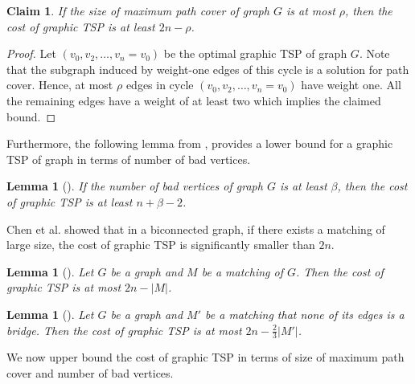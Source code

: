 \documentclass[letterpaper,11pt]{article}
\newtheorem{lemma}[theorem]{Lemma}
\newtheorem{claim}[theorem]{Claim}
\newenvironment{myproof}{
\vspace{-0.5cm}
\begin{proof}
}{
\end{proof}
}
\begin{document}
\begin{claim}\label{lem: lower-bound-path}
If the size of maximum path cover of graph $G$ is at most $\rho$, then the cost of graphic TSP is at least $2n - \rho$.  
\end{claim}
\begin{myproof}
Let $(v_0, v_2, \ldots, v_n = v_0)$ be the optimal graphic TSP of graph $G$. Note that the subgraph induced by weight-one edges of this cycle is a solution for path cover. Hence, at most $\rho$ edges in cycle $(v_0, v_2, \ldots, v_n = v_0)$ have weight one. All the remaining edges have a weight of at least two which implies the claimed bound.
\end{myproof}

Furthermore, the following lemma from \cite{chen2020}, provides a lower bound for a graphic TSP of graph in terms of number of bad vertices.

\begin{lemma}[{\cite[Lemma~2.8]{chen2020}}]\label{lem: lower-bound-bad-vertex}
If the number of bad vertices of graph $G$ is at least $\beta$, then the cost of graphic TSP is at least $n + \beta - 2$.
\end{lemma}


Chen et al. \cite{chen2020} showed that in a biconnected graph, if there exists a matching of large size, the cost of graphic TSP is significantly smaller than $2n$. 

\begin{lemma}[{\cite[Lemma~2.7]{chen2020}}]\label{lem: tsp-matching-bound}
Let $G$ be a graph and $M$ be a matching of $G$. Then the cost of graphic TSP is at most $2n - |M|$.
\end{lemma}

\begin{lemma}[{\cite[Lemma~2.11]{chen2020}}]\label{lem: non-bridge-matching}
Let $G$ be a graph and $M'$ be a matching that none of its edges is a bridge. Then the cost of graphic TSP is at most $2n - \frac{2}{3}|M'|$.
\end{lemma}

We now upper bound the cost of graphic TSP in terms of size of maximum path cover and number of bad vertices.
\end{document}
